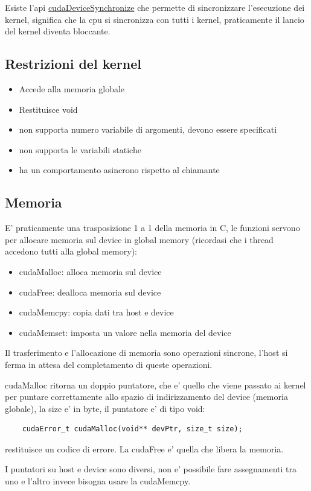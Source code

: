 Esiste l'api \underline{cudaDeviceSynchronize} che permette di sincronizzare l'esecuzione dei kernel, significa che la cpu si sincronizza con tutti i kernel, praticamente il lancio del kernel diventa bloccante.

\subsection{Restrizioni del kernel}
\begin{itemize}
    \item Accede alla memoria globale
    \item Restituisce void
    \item non supporta numero variabile di argomenti, devono essere specificati
    \item non supporta le variabili statiche
    \item ha un comportamento asincrono rispetto al chiamante
\end{itemize}

\subsection{Memoria}
E' praticamente una trasposizione 1 a 1 della memoria in C, le funzioni servono per allocare memoria sul device in global memory (ricordasi che i thread accedono tutti alla global memory):
\begin{itemize}
    \item cudaMalloc: alloca memoria sul device
    \item cudaFree: dealloca memoria sul device
    \item cudaMemcpy: copia dati tra host e device
    \item cudaMemset: imposta un valore nella memoria del device
\end{itemize}
Il trasferimento e l'allocazione di memoria sono operazioni sincrone, l'host si ferma in attesa del completamento di queste operazioni.

cudaMalloc ritorna un doppio puntatore, che e' quello che viene passato ai kernel per puntare correttamente allo spazio di indirizzamento del device (memoria globale), la size e' in byte, il puntatore e' di tipo void\*:
\begin{lstlisting}
    cudaError_t cudaMalloc(void** devPtr, size_t size);
\end{lstlisting}

restituisce un codice di errore. La cudaFree e' quella che libera la memoria.

I puntatori su host e device sono diversi, non e' possibile fare assegnamenti tra uno e l'altro invece bisogna usare la cudaMemcpy.
